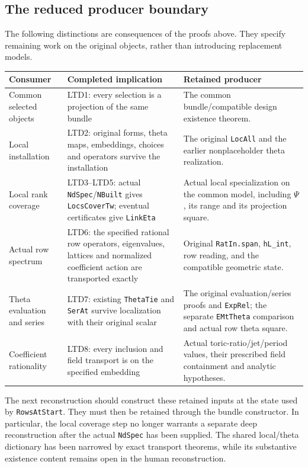 \subsection*{The reduced producer boundary}

The following distinctions are consequences of the proofs above.
They specify remaining work on the original objects, rather than
introducing replacement models.

\begin{longtable}{p{}p{}p{}}
\textbf{Consumer}&\textbf{Completed implication}&\textbf{Retained producer}\\\hline
Common selected objects&LTD1: every selection is a projection of the
same bundle&The common bundle/compatible design existence theorem.\\
Local installation&LTD2: original forms, theta maps, embeddings,
choices and operators survive the installation&The original
\texttt{LocAll} and the earlier nonplaceholder theta realization.\\
Local rank coverage&LTD3--LTD5: actual \texttt{NdSpec}/\texttt{NBuilt}
gives \texttt{LocsCoverTw}; eventual certificates give
\texttt{LinkEta}&Actual local specialization on the common model,
including \(\Psi\), its range and its projection square.\\
Actual row spectrum&LTD6: the specified rational row operators,
eigenvalues, lattices and normalized coefficient action are transported
exactly&Original \texttt{RatIn.span}, \texttt{hL\_int}, row reading,
and the compatible geometric state.\\
Theta evaluation and series&LTD7: existing \texttt{ThetaTie} and
\texttt{SerAt} survive localization with their original scalar&The
original evaluation/series proofs and \texttt{ExpRel}; the separate
\texttt{EMtTheta} comparison and actual row theta square.\\
Coefficient rationality&LTD8: every inclusion and field transport is
on the specified embedding&Actual toric-ratio/jet/period values,
their prescribed field containment and analytic hypotheses.\\
\end{longtable}

The next reconstruction should construct these retained inputs at
the state used by \texttt{RowsAtStart}.  They must then be retained
through the bundle constructor.  In particular, the local coverage step no
longer warrants a separate deep reconstruction after the actual
\texttt{NdSpec} has been supplied.  The shared local/theta dictionary
has been narrowed by exact transport theorems, while its substantive
existence content remains open in the human reconstruction.
